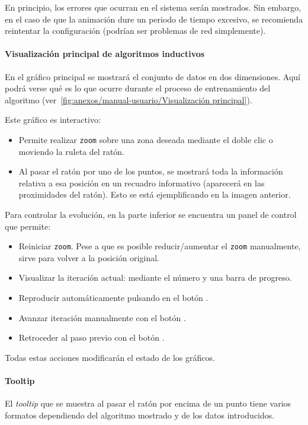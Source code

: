 En principio, los errores que ocurran en el sistema serán mostrados. Sin embargo, en el caso de que la animación dure un periodo de tiempo excesivo, se recomienda reintentar la configuración (podrían ser problemas de red simplemente).

\paragraph{Visualización principal de algoritmos inductivos} En el gráfico principal se mostrará el conjunto de datos en dos dimensiones. Aquí podrá verse qué es lo que ocurre durante el proceso de entrenamiento del algoritmo (ver~\ref{fig:anexos/manual-usuario/Visualización principal}).


Este gráfico es interactivo:
\begin{itemize}
    \item Permite realizar \texttt{zoom} sobre una zona deseada mediante el
    doble clic o moviendo la ruleta del ratón.
    \item Al pasar el ratón por uno de los puntos, se mostrará toda la
    información relativa a esa posición en un recuadro informativo (aparecerá en
    las proximidades del ratón). Esto se está ejemplificando en la imagen
    anterior.
\end{itemize}

Para controlar la evolución, en la parte inferior se encuentra un panel de
control que permite:
\begin{itemize}
    \item Reiniciar \texttt{zoom}. Pese a que es posible reducir/aumentar el
    \texttt{zoom} manualmente, sirve para volver a la posición original.
    \item Visualizar la iteración actual: mediante el número y una barra de
    progreso.
    \item Reproducir automáticamente pulsando en el botón \button{$\blacktriangleright$}.
    \item Avanzar iteración manualmente con el botón \button{$\gg$}.
    \item Retroceder al paso previo con el botón  \button{$\ll$}.
\end{itemize}

Todas estas acciones modificarán el estado de los gráficos.

\paragraph{Tooltip} El \textit{tooltip} que se muestra al pasar el ratón por
encima de un punto tiene varios formatos dependiendo del algoritmo mostrado y de
los datos introducidos.

